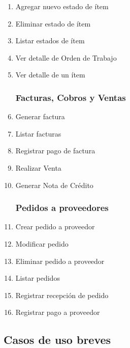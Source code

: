 \documentclass[12pt]{extarticle}
\begin{document}
\begin{spacing}{1.2}
\begin{multicols}{2}
\begin{enumerate}
                \item Agregar nuevo estado de ítem
                \item Eliminar estado de ítem
                \item Listar estados de ítem

                \item Ver detalle de Orden de Trabajo
                \item Ver detalle de un ítem
            \subsubsection*{Facturas, Cobros y Ventas}
                \item Generar factura 
                \item Listar facturas
                \item Registrar pago de factura
                \item Realizar Venta
                \item Generar Nota de Crédito
            \subsubsection*{Pedidos a proveedores}
                \item Crear pedido a proveedor
                \item Modificar pedido %
                \item Eliminar pedido a proveedor
                \item Listar pedidos
                \item Registrar recepción de pedido
                \item Registrar pago a proveedor
        \end{enumerate}
        \end{multicols}

        \clearpage

        \subsection{Casos de uso breves}


        \begin{enumerate}




\end{enumerate}
\end{spacing}
\end{document}
